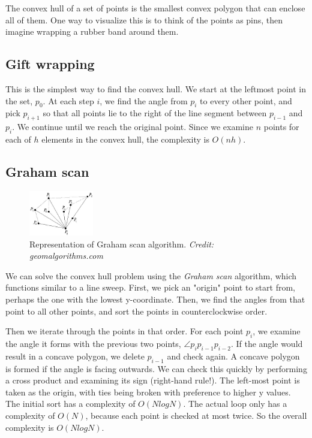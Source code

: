 \documentclass{article}
\begin{document}
The convex hull of a set of points is the smallest convex polygon that can enclose all of them. One way to visualize this is to think of the points as pins, then imagine wrapping a rubber band around them.

\subsection{Gift wrapping}

This is the simplest way to find the convex hull. We start at the leftmost point in the set, $p_0$. At each step $i$, we find the angle from $p_i$ to every other point, and pick $p_{i+1}$ so that all points lie to the right of the line segment between $p_{i-1}$ and $p_i$. We continue until we reach the original point. Since we examine $n$ points for each of $h$ elements in the convex hull, the complexity is $O(nh)$.

\subsection{Graham scan}

\begin{figure}
  \vspace{-40pt}
  \begin{center}
    \includegraphics[width=0.25\textwidth]{Pic_graham2.jpg}
  \end{center}
  \caption{Representation of Graham scan algorithm. \textit{Credit: geomalgorithms.com}}
  \vspace{-15pt}
\end{figure}

We can solve the convex hull problem using the \textit{Graham scan} algorithm, which functions similar to a line sweep. First, we pick an "origin" point to start from, perhaps the one with the lowest y-coordinate. Then, we find the angles from that point to all other points, and sort the points in counterclockwise order.

Then we iterate through the points in that order. For each point $p_i$, we examine the angle it forms with the previous two points, $\angle p_i p_{i-1} p_{i-2}$. If the angle would result in a concave polygon, we delete $p_{i-1}$ and check again. A concave polygon is formed if the angle is facing outwards. We can check this quickly by performing a cross product and examining its sign (right-hand rule!).
The left-most point is taken as the origin, with ties being broken with preference to higher y values.
The initial sort has a complexity of $O(N log N)$. The actual loop only has a complexity of $O(N)$, because each point is checked at most twice. So the overall complexity is $O(N log N)$.
\end{document}
